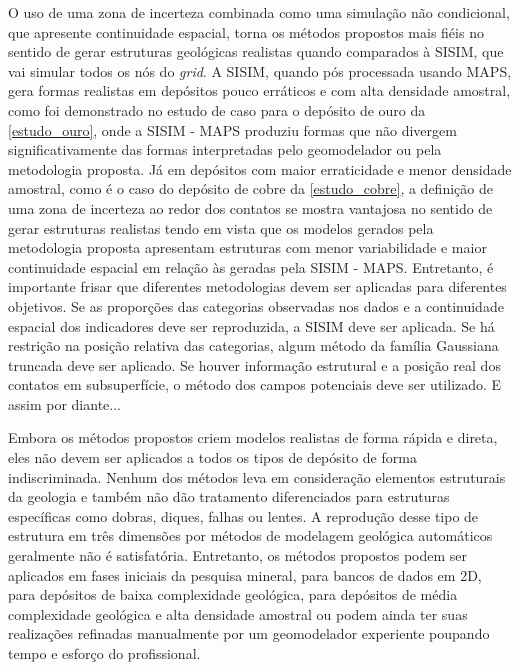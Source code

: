 O uso de uma zona de incerteza combinada como uma simulação não condicional, que apresente continuidade espacial, torna os métodos propostos mais fiéis no sentido de gerar estruturas geológicas realistas quando comparados à SISIM, que vai simular todos os nós do \textit{grid}. A SISIM, quando pós processada usando MAPS, gera formas realistas em depósitos pouco erráticos e com alta densidade amostral, como foi demonstrado no estudo de caso para o depósito de ouro da \autoref{estudo_ouro}, onde a SISIM - MAPS produziu formas que não divergem significativamente das formas interpretadas pelo geomodelador ou pela metodologia proposta. Já em depósitos com maior erraticidade e menor densidade amostral, como é o caso do depósito de cobre da \autoref{estudo_cobre}, a definição de uma zona de incerteza ao redor dos contatos se mostra vantajosa no sentido de gerar estruturas realistas tendo em vista que os modelos gerados pela metodologia proposta apresentam estruturas com menor variabilidade e maior continuidade espacial em relação às geradas pela SISIM - MAPS. Entretanto, é importante frisar que diferentes metodologias devem ser aplicadas para diferentes objetivos. Se as proporções das categorias observadas nos dados e a continuidade espacial dos indicadores deve ser reproduzida, a SISIM deve ser aplicada. Se há restrição na posição relativa das categorias, algum método da família Gaussiana truncada deve ser aplicado. Se houver informação estrutural e a posição real dos contatos em subsuperfície, o método dos campos potenciais deve ser utilizado. E assim por diante...

Embora os métodos propostos criem modelos realistas de forma rápida e direta, eles não devem ser aplicados a todos os tipos de depósito de forma indiscriminada. Nenhum dos métodos leva em consideração elementos estruturais da geologia e também não dão tratamento diferenciados para estruturas específicas como dobras, diques, falhas ou lentes. A reprodução desse tipo de estrutura em três dimensões por métodos de modelagem geológica automáticos geralmente não é satisfatória. Entretanto, os métodos propostos podem ser aplicados em fases iniciais da pesquisa mineral, para bancos de dados em 2D, para depósitos de baixa complexidade geológica, para depósitos de média complexidade geológica e alta densidade amostral ou podem ainda ter suas realizações refinadas manualmente por um geomodelador experiente poupando tempo e esforço do profissional.  

